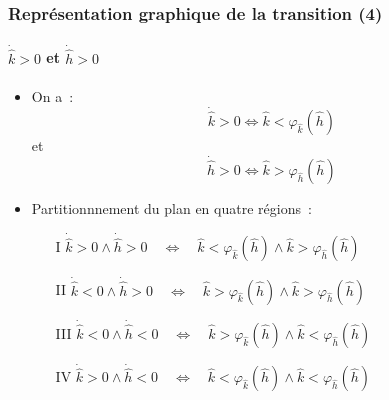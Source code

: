 \documentclass[10pt,notheorems]{beamer}
\theoremstyle{plain}
\theoremstyle{definition} %
\begin{document}
\begin{frame}
  \frametitle{Représentation graphique de la transition (4)}
  \framesubtitle{$\dot{\hat k}>0$ et $\dot{\hat h}>0$}
  \begin{itemize}

  \item On a~:
    \[
      \dot{\hat k}>0 \Leftrightarrow \hat k < \varphi_{\hat k}(\hat h)
    \]
    et
    \[
      \dot{\hat h}>0 \Leftrightarrow \hat k > \varphi_{\hat h}(\hat h)
    \]

    \bigskip

  \item Partitionnnement du plan en quatre régions~:\newline
    \begin{itemize}
    \item[I]  $\dot{\hat k}>0 \land \dot{\hat h}>0 \quad \Leftrightarrow \quad \hat k < \varphi_{\hat k}(\hat h) \land \hat k > \varphi_{\hat h}(\hat h)$
    \item[II] $\dot{\hat k}<0 \land \dot{\hat h}>0  \quad \Leftrightarrow \quad \hat k > \varphi_{\hat k}(\hat h) \land \hat k > \varphi_{\hat h}(\hat h)$
    \item[III]  $\dot{\hat k}<0 \land \dot{\hat h}<0 \quad \Leftrightarrow \quad \hat k > \varphi_{\hat k}(\hat h) \land \hat k < \varphi_{\hat h}(\hat h)$
    \item[IV] $\dot{\hat k}>0 \land \dot{\hat h}<0  \quad \Leftrightarrow \quad \hat k < \varphi_{\hat k}(\hat h) \land \hat k < \varphi_{\hat h}(\hat h)$
    \end{itemize}

  \end{itemize}

\end{frame}
\end{document}
